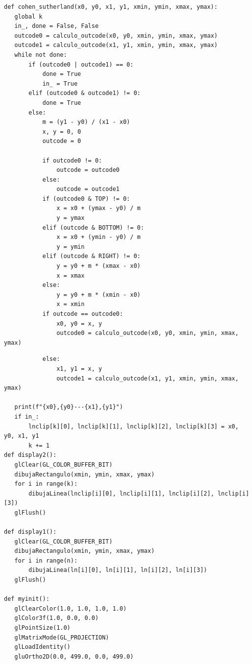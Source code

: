 \documentclass[a4paper]{article}
\begin{document}
\begin{center}
\begin{mycodebox}
\begin{lstlisting}
def cohen_sutherland(x0, y0, x1, y1, xmin, ymin, xmax, ymax):
   global k
   in_, done = False, False
   outcode0 = calculo_outcode(x0, y0, xmin, ymin, xmax, ymax)
   outcode1 = calculo_outcode(x1, y1, xmin, ymin, xmax, ymax)
   while not done:
       if (outcode0 | outcode1) == 0:
           done = True
           in_ = True
       elif (outcode0 & outcode1) != 0:
           done = True
       else:
           m = (y1 - y0) / (x1 - x0)
           x, y = 0, 0
           outcode = 0
 
           if outcode0 != 0:
               outcode = outcode0
           else:
               outcode = outcode1
           if (outcode0 & TOP) != 0:
               x = x0 + (ymax - y0) / m
               y = ymax
           elif (outcode & BOTTOM) != 0:
               x = x0 + (ymin - y0) / m
               y = ymin
           elif (outcode & RIGHT) != 0:
               y = y0 + m * (xmax - x0)
               x = xmax
           else:
               y = y0 + m * (xmin - x0)
               x = xmin
           if outcode == outcode0:
               x0, y0 = x, y
               outcode0 = calculo_outcode(x0, y0, xmin, ymin, xmax, ymax)
\end{lstlisting}
\end{mycodebox}
\end{center}

\begin{center}
\begin{mycodebox}
\begin{lstlisting}
           else:
               x1, y1 = x, y
               outcode1 = calculo_outcode(x1, y1, xmin, ymin, xmax, ymax)
 
   print(f"{x0},{y0}---{x1},{y1}")
   if in_:
       lnclip[k][0], lnclip[k][1], lnclip[k][2], lnclip[k][3] = x0, y0, x1, y1
       k += 1
def display2():
   glClear(GL_COLOR_BUFFER_BIT)
   dibujaRectangulo(xmin, ymin, xmax, ymax)
   for i in range(k):
       dibujaLinea(lnclip[i][0], lnclip[i][1], lnclip[i][2], lnclip[i][3])
   glFlush()
 
def display1():
   glClear(GL_COLOR_BUFFER_BIT)
   dibujaRectangulo(xmin, ymin, xmax, ymax)
   for i in range(n):
       dibujaLinea(ln[i][0], ln[i][1], ln[i][2], ln[i][3])
   glFlush()
 
def myinit():
   glClearColor(1.0, 1.0, 1.0, 1.0)
   glColor3f(1.0, 0.0, 0.0)
   glPointSize(1.0)
   glMatrixMode(GL_PROJECTION)
   glLoadIdentity()
   gluOrtho2D(0.0, 499.0, 0.0, 499.0)
\end{lstlisting}
\end{mycodebox}
\end{center}
\end{document}
